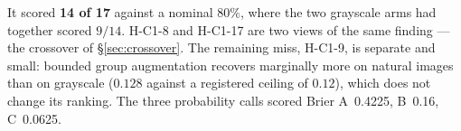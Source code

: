 It scored \textbf{14 of 17} against a nominal $80\%$, where the two grayscale arms had together scored $9/14$. H-C1-8 and H-C1-17 are two views of the same finding --- the crossover of \S\ref{sec:crossover}. The remaining miss, H-C1-9, is separate and small: bounded group augmentation recovers marginally more on natural images than on grayscale ($0.128$ against a registered ceiling of $0.12$), which does not change its ranking. The three probability calls scored Brier A~0.4225, B~0.16, C~0.0625.
